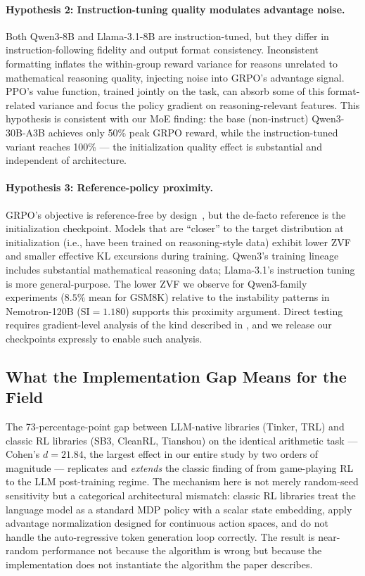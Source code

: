 \documentclass{article}
\begin{document}
\paragraph{Hypothesis 2: Instruction-tuning quality modulates advantage noise.}
Both Qwen3-8B and Llama-3.1-8B are instruction-tuned, but they differ in
instruction-following fidelity and output format consistency.
Inconsistent formatting inflates the within-group reward variance for reasons
unrelated to mathematical reasoning quality, injecting noise into GRPO's
advantage signal.
PPO's value function, trained jointly on the task, can absorb some of this
format-related variance and focus the policy gradient on reasoning-relevant
features.
This hypothesis is consistent with our MoE finding: the base (non-instruct)
Qwen3-30B-A3B achieves only 50\% peak GRPO reward, while the instruction-tuned
variant reaches 100\% --- the initialization quality effect is substantial and
independent of architecture.

\paragraph{Hypothesis 3: Reference-policy proximity.}
GRPO's objective is reference-free by design~\citep{shao2024deepseekmath},
but the de-facto reference is the initialization checkpoint.
Models that are ``closer'' to the target distribution at initialization (i.e.,
have been trained on reasoning-style data) exhibit lower ZVF and smaller
effective KL excursions during training.
Qwen3's training lineage includes substantial mathematical reasoning data;
Llama-3.1's instruction tuning is more general-purpose.
The lower ZVF we observe for Qwen3-family experiments ($8.5\%$ mean for GSM8K)
relative to the instability patterns in Nemotron-120B ($\text{SI} = 1.180$)
supports this proximity argument.
Direct testing requires gradient-level analysis of the kind described in
\citet{liu2025rlsubnetworks}, and we release our checkpoints expressly to
enable such analysis.

\subsection{What the Implementation Gap Means for the Field}
\label{sec:discuss_impl}

The 73-percentage-point gap between LLM-native libraries (Tinker, TRL) and
classic RL libraries (SB3, CleanRL, Tianshou) on the identical arithmetic task
--- Cohen's $d = 21.84$, the largest effect in our entire study by two orders
of magnitude --- replicates and \emph{extends} the classic finding of
\citet{henderson2018deep} from game-playing RL to the LLM post-training
regime.
The mechanism here is not merely random-seed sensitivity but a categorical
architectural mismatch: classic RL libraries treat the language model as a
standard MDP policy with a scalar state embedding, apply advantage normalization
designed for continuous action spaces, and do not handle the auto-regressive
token generation loop correctly.
The result is near-random performance not because the algorithm is wrong but
because the implementation does not instantiate the algorithm the paper
describes.
\end{document}
